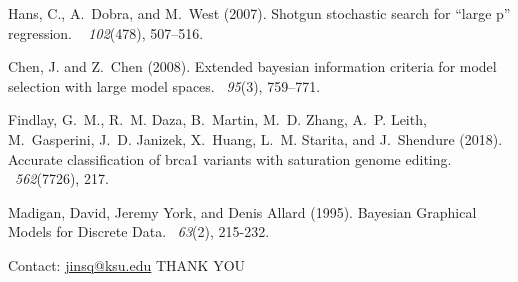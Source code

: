 \documentclass[citecolor=blue,10pt]{beamer}
\newcommand{\0} {\mbox{\boldmath$0$}}
\begin{document}
\begin{frame}
\begin{thebibliography}{}
Hans, C., A.~Dobra, and M.~West (2007).
\newblock Shotgun stochastic search for ``large p'' regression.
~{\em
  102\/}(478), 507--516.


Chen, J. and Z.~Chen (2008).
\newblock Extended bayesian information criteria for model selection with large
  model spaces.
~{\em 95\/}(3), 759--771.


Findlay, G.~M., R.~M. Daza, B.~Martin, M.~D. Zhang, A.~P. Leith, M.~Gasperini,
  J.~D. Janizek, X.~Huang, L.~M. Starita, and J.~Shendure (2018).
\newblock Accurate classification of brca1 variants with saturation genome
  editing.
~{\em 562\/}(7726), 217.

Madigan, David, Jeremy York, and Denis Allard (1995).
\newblock Bayesian Graphical Models for Discrete Data.
~{\em 63\/}(2), 215-232.



\end{thebibliography}
\end{frame}
%

\begin{frame}{Contact: \url{jinsq@ksu.edu}}
\vspace{2mm}
\centering \huge THANK YOU
\end{frame}
\end{document}
